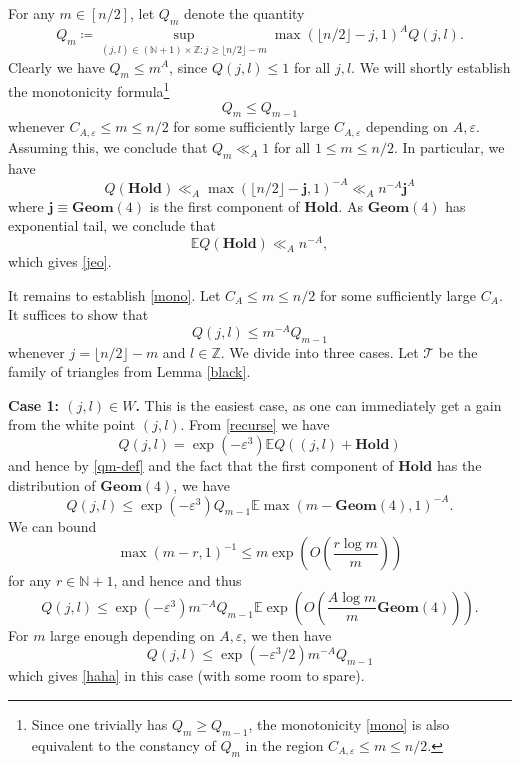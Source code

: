 \documentclass[12pt,a4paper,reqno]{amsart}
\numberwithin{equation}{section}
\theoremstyle{plain}
\theoremstyle{definition}
\newcommand\E{\mathbb{E}}
\newcommand\Z{\mathbb{Z}}
\newcommand\N{\mathbb{N}}
\renewcommand\j{\mathbf{j}}
\newcommand\Geom{\mathbf{Geom}}
\newcommand\Hold{\mathbf{Hold}}
\newcommand\eps{\varepsilon}
\begin{document}
For any $m \in [n/2]$, let $Q_m$ denote the quantity
\begin{equation}\label{qm-def}
 Q_m \coloneqq \sup_{(j,l) \in (\N+1) \times \Z: j \geq \lfloor n/2\rfloor - m} \max(\lfloor n/2\rfloor -j,1)^A Q(j,l).
\end{equation}
Clearly we have $Q_m \leq m^A$, since $Q(j,l) \leq 1$ for all $j,l$.  We will shortly establish the monotonicity formula\footnote{Since one trivially has $Q_m \geq Q_{m-1}$, the monotonicity \eqref{mono} is also equivalent to the constancy of $Q_m$ in the region $C_{A,\eps} \leq m \leq n/2$.}
\begin{equation}\label{mono}
Q_m \leq Q_{m-1}
\end{equation}
whenever $C_{A,\eps} \leq m \leq n/2$ for some sufficiently large $C_{A,\eps}$ depending on $A,\eps$.  Assuming this, we conclude that $Q_m \ll_A 1$ for all $1 \leq m \leq n/2$. In particular, we have
$$ Q(\Hold) \ll_A \max(\lfloor n/2\rfloor -\j,1)^{-A} \ll_A n^{-A} \j^A$$
where $\j \equiv \Geom(4)$ is the first component of $\Hold$.  As $\Geom(4)$ has exponential tail, we conclude that
$$ \E Q(\Hold) \ll_A n^{-A},$$
which gives \eqref{jeo}.

It remains to establish \eqref{mono}.  Let $C_A \leq m \leq n/2$ for some sufficiently large $C_A$.  It suffices to show that 
\begin{equation}\label{haha}
 Q(j,l) \leq m^{-A} Q_{m-1}
\end{equation}
whenever $j = \lfloor n/2 \rfloor - m$ and $l \in \Z$.  We divide into three cases.  Let ${\mathcal T}$ be the family of triangles from Lemma \ref{black}.

\textbf{Case 1: $(j,l) \in W$.}  This is the easiest case, as one can immediately get a gain from the white point $(j,l)$.  From \eqref{recurse} we have
$$ Q(j,l) = \exp( - \eps^3 ) \E Q((j,l) + \Hold)$$
and hence by \eqref{qm-def} and the fact that the first component of $\Hold$ has the distribution of $\Geom(4)$, we have
$$ Q(j,l) \leq \exp( - \eps^3 ) Q_{m-1} \E \max( m - \Geom(4), 1)^{-A}.$$
We can bound
\begin{equation}\label{magi}
 \max(m-r,1)^{-1} \leq m \exp\left( O\left( \frac{r\log m}{m}\right ) \right)
\end{equation}
for any $r \in \N+1$, and hence
and thus
$$ Q(j,l) \leq \exp( - \eps^3 ) m^{-A} Q_{m-1} \E \exp\left( O\left( \frac{A\log m}{m} \Geom(4) \right) \right).$$
For $m$ large enough depending on $A,\eps$, we then have
\begin{equation}\label{qjl}
 Q(j,l) \leq \exp( - \eps^3/2 ) m^{-A} Q_{m-1}
\end{equation}
which gives \eqref{haha} in this case (with some room to spare).
\end{document}
